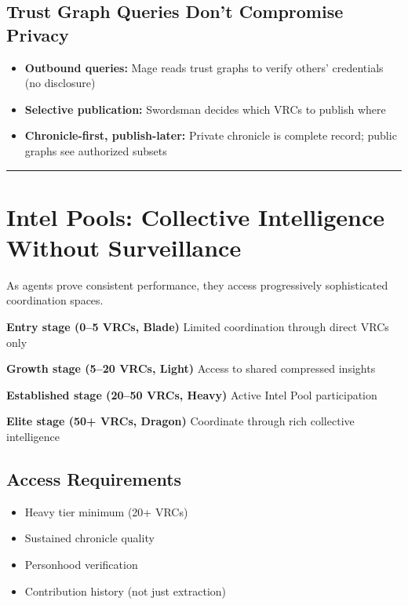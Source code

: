\documentclass[
  11pt,
]{article}
\begin{document}
\subsection{Trust Graph Queries Don't Compromise
Privacy}\label{trust-graph-queries-dont-compromise-privacy}

\begin{itemize}
\item
  \textbf{Outbound queries:} Mage reads trust graphs to verify others'
  credentials (no disclosure)
\item
  \textbf{Selective publication:} Swordsman decides which VRCs to
  publish where
\item
  \textbf{Chronicle-first, publish-later:} Private chronicle is complete
  record; public graphs see authorized subsets
\end{itemize}

\begin{center}\rule{0.5\linewidth}{0.5pt}\end{center}

\section{Intel Pools: Collective Intelligence Without
Surveillance}\label{intel-pools-collective-intelligence-without-surveillance}

As agents prove consistent performance, they access progressively
sophisticated coordination spaces.

\textbf{Entry stage (0--5 VRCs, Blade)} Limited coordination through
direct VRCs only

\textbf{Growth stage (5--20 VRCs, Light)} Access to shared compressed
insights

\textbf{Established stage (20--50 VRCs, Heavy)} Active Intel Pool
participation

\textbf{Elite stage (50+ VRCs, Dragon)} Coordinate through rich
collective intelligence

\subsection{Access Requirements}\label{access-requirements}

\begin{itemize}
\item
  Heavy tier minimum (20+ VRCs)
\item
  Sustained chronicle quality
\item
  Personhood verification
\item
  Contribution history (not just extraction)
\end{itemize}
\end{document}
